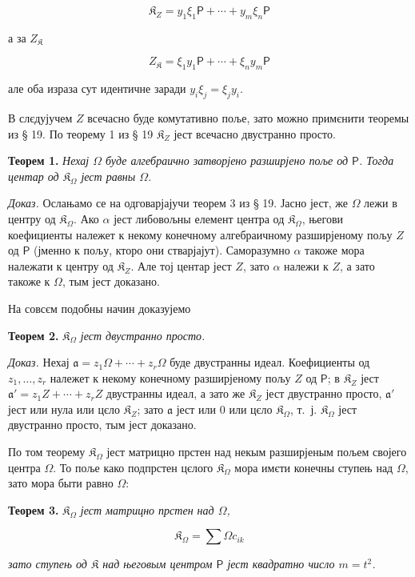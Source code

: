 \documentclass[11pt]{article}
\begin{document}
\[
\mathfrak K_Z=y_1\xi_1\mathsf P+\cdots+y_m\xi_n\mathsf P
\]

а за \(Z_{\mathfrak K}\)

\[
Z_{\mathfrak K}=\xi_1y_1\mathsf P+\cdots+\xi_ny_m\mathsf P
\]

але оба израза сут идентичне заради \(y_i\xi_j=\xi_jy_i\).

В слєдујучем \(Z\) всечасно буде комутативно поље, зато можно примєнити теоремы из § 19. По теорему 1 из § 19 \(\mathfrak K_Z\) јест всечасно двустранно просто.

\textbf{Теорем 1.} \emph{Нехај \(\Omega\) буде алгебраично затворјено разширјено поље од \(\mathsf P\). Тогда центар од \(\mathfrak K_\Omega\) јест равны \(\Omega\).}

\emph{Доказ.} Ослањамо се на одговарјајучи теорем 3 из § 19. Јасно јест, же \(\Omega\) лежи в центру од \(\mathfrak K_\Omega\). Ако \(\alpha\) јест либовољны елемент центра од \(\mathfrak K_\Omega\), његови коефициенты належет к некому конечному алгебраичному разширјеному пољу \(Z\) од \(\mathsf P\) (јменно к пољу, кторо они стварјајут). Саморазумно \(\alpha\) такоже мора належати к центру од \(\mathfrak K_Z\). Але тој центар јест \(Z\), зато \(\alpha\) належи к \(Z\), а зато такоже к \(\Omega\), тым јест доказано.

На совсєм подобны начин доказујемо

\textbf{Теорем 2.} \emph{\(\mathfrak K_\Omega\) јест двустранно просто.}

\emph{Доказ.} Нехај \(\mathfrak a=z_1\Omega+\cdots+z_r\Omega\) буде двустранны идеал. Коефициенты од \(z_1,\ldots,z_r\) належет к некому конечному разширјеному пољу \(Z\) од \(\mathsf P\); в \(\mathfrak K_Z\) јест \(\mathfrak a'=z_1Z+\cdots+z_rZ\) двустранны идеал, а зато же \(\mathfrak K_Z\) јест двустранно просто, \(\mathfrak a'\) јест или нула или цєло \(\mathfrak K_Z\); зато \(\mathfrak a\) јест или 0 или цєло \(\mathfrak K_\Omega\), т.~ј. \(\mathfrak K_\Omega\) јест двустранно просто, тым јест доказано.

По том теорему \(\mathfrak K_\Omega\) јест матрицно прстен над некым разширјеным пољем својего центра \(\Omega\). То поље како подпрстен цєлого \(\mathfrak K_\Omega\) мора имєти конечны ступењ над \(\Omega\), зато мора быти равно \(\Omega\):

\textbf{Теорем 3.} \emph{\(\mathfrak K_\Omega\) јест матрицно прстен над \(\Omega\),}

\[
\mathfrak K_\Omega=\sum\Omega c_{ik}
\]

\emph{зато ступењ од \(\mathfrak K\) над његовым центром \(\mathsf P\) јест квадратно число \(m=t^2\).}
\end{document}
